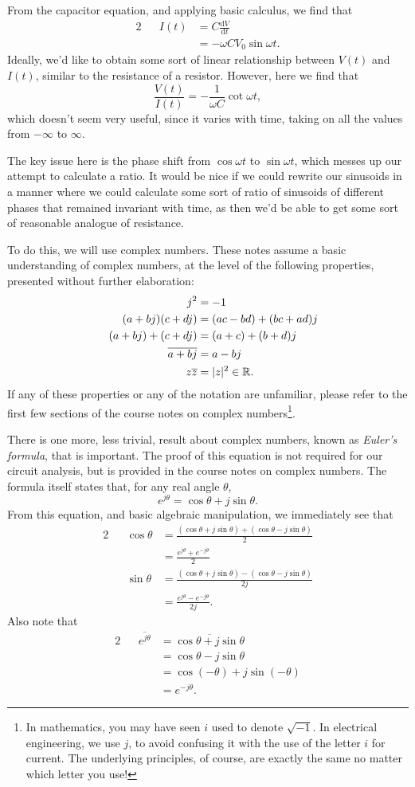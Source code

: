 \documentclass[letterpaper]{article}
\theoremstyle{remark}
\newcommand{\dt}{\mathrm{d}t}
\newcommand{\diff}{\mathrm{d}}
\DeclarePairedDelimiter\abs{\lvert}{\rvert}%
\newcommand{\eqn}[1]{\begin{alignat*}{2}#1\end{alignat*}}
\begin{document}
From the capacitor equation, and applying basic calculus, we find that
\eqn{
    && I(t) &= C \frac{\diff V}{\dt} \\
    &&&= -\omega C V_0 \sin{\omega t}.
}
Ideally, we'd like to obtain some sort of linear relationship between $V(t)$ and $I(t)$, similar to the resistance of a resistor. However, here we find that
\[
    \frac{V(t)}{I(t)} = -\frac{1}{\omega C} \cot{\omega t},
\]
which doesn't seem very useful, since it varies with time, taking on all the values from $-\infty$ to $\infty$.

The key issue here is the phase shift from $\cos{\omega t}$ to $\sin{\omega t}$, which messes up our attempt to calculate a ratio. It would be nice if we could rewrite our sinusoids in a manner where we could calculate some sort of ratio of sinusoids of different phases that remained invariant with time, as then we'd be able to get some sort of reasonable analogue of resistance.

To do this, we will use complex numbers. These notes assume a basic understanding of complex numbers, at the level of the following properties, presented without further elaboration:
\eqn{
    && j^2 &= -1 \\
    && (a + bj) (c + dj) &= (ac - bd) + (bc + ad)j \\
    && (a + bj) + (c + dj) &= (a + c) + (b + d)j \\
    && \overline{a + bj} &= a - bj \\
    && z\overline{z} &= \abs{z}^2 \in \mathbb{R}.
}
If any of these properties or any of the notation are unfamiliar, please refer to the first few sections of the course notes on complex numbers\footnote{In mathematics, you may have seen $i$ used to denote $\sqrt{-1}$. In electrical engineering, we use $j$, to avoid confusing it with the use of the letter $i$ for current. The underlying principles, of course, are exactly the same no matter which letter you use!}.

There is one more, less trivial, result about complex numbers, known as \emph{Euler's formula}, that is important. The proof of this equation is not required for our circuit analysis, but is provided in the course notes on complex numbers. The formula itself states that, for any real angle $\theta$,
\[
    e^{j\theta} = \cos{\theta} + j\sin{\theta}.
\]
From this equation, and basic algebraic manipulation, we immediately see that
\eqn{
    && \cos{\theta} &= \frac{(\cos{\theta} + j\sin{\theta}) + (\cos{\theta} - j\sin{\theta})}{2} \\
    &&&= \frac{e^{j\theta} + e^{-j\theta}}{2} \\
    && \sin{\theta} &= \frac{(\cos{\theta} + j\sin{\theta}) - (\cos{\theta} - j\sin{\theta})}{2j} \\
    &&&= \frac{e^{j\theta} - e^{-j\theta}}{2j}.
}
Also note that
\eqn{
    && \overline{e^{j\theta}} &= \overline{\cos{\theta} + j\sin{\theta}} \\
    &&&= \cos{\theta} - j\sin{\theta} \\
    &&&= \cos{(-\theta)} + j\sin{(-\theta)} \\
    &&&= e^{-j\theta}.
}
\end{document}

